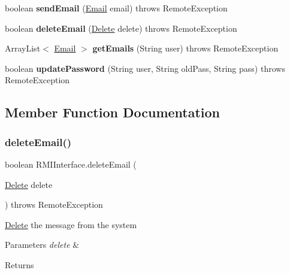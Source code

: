 \begin{DoxyCompactItemize}
\item 
\mbox{\label{interface_r_m_i_interface_ad86e01382cdb0cb8a64710a7e9102524}} 
boolean {\bfseries send\+Email} (\hyperlink{class_email}{Email} email)  throws Remote\+Exception
\item 
\mbox{\label{interface_r_m_i_interface_a86bc2a5cb0bdb04a1aeb9b36e373cd5e}} 
boolean {\bfseries delete\+Email} (\hyperlink{class_delete}{Delete} delete)  throws Remote\+Exception
\item 
\mbox{\label{interface_r_m_i_interface_ad326010c8c132dd3398a4443cf827601}} 
Array\+List$<$ \hyperlink{class_email}{Email} $>$ {\bfseries get\+Emails} (String user)  throws Remote\+Exception
\item 
\mbox{\label{interface_r_m_i_interface_a643b5963469fbc121032c7d75c01c7b9}} 
boolean {\bfseries update\+Password} (String user, String old\+Pass, String pass)  throws Remote\+Exception
\end{DoxyCompactItemize}


\subsection{Member Function Documentation}
\mbox{\label{interface_r_m_i_interface_a86bc2a5cb0bdb04a1aeb9b36e373cd5e}} 
\subsubsection{\texorpdfstring{delete\+Email()}{deleteEmail()}}
{\footnotesize\ttfamily boolean R\+M\+I\+Interface.\+delete\+Email (\begin{DoxyParamCaption}\item[{\hyperlink{class_delete}{Delete}}]{delete }\end{DoxyParamCaption}) throws Remote\+Exception}

\hyperlink{class_delete}{Delete} the message from the system 
\begin{DoxyParams}{Parameters}
{\em delete} & \\
\hline
\end{DoxyParams}
\begin{DoxyReturn}{Returns}

\end{DoxyReturn}

